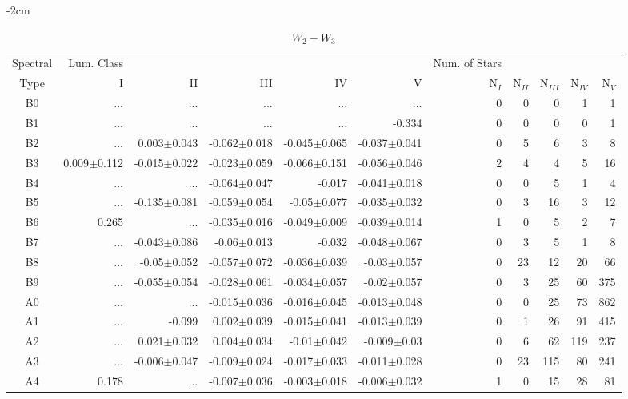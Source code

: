 \begin{table}[t]
\tiny
\centering
\caption{$W_{2}-W_{3}$}
\begin{center}
    \addtolength{\leftskip} {-2cm}
    \addtolength{\rightskip}{-2cm}
    \begin{tabular}{c|rrrrr|rrrrr}
    \toprule
    Spectral & Lum. Class & & & & & Num. of Stars & & & &  \\
    Type & I & II & III &  IV & V & N$_{I}$ & N$_{II}$ & N$_{III}$ & N$_{IV}$ & N$_{V}$ \\ \midrule
 
  
B0	&	 ...	&	 ...	&	 ...	&	 ...	&	 ...	&	0	&	0	&	0	&	1	&	1	\\
B1	&	 ...	&	 ...	&	 ...	&	 ...	&	-0.334	&	0	&	0	&	0	&	0	&	1	\\
B2	&	 ...	&	0.003$\pm$0.043	&	-0.062$\pm$0.018	&	-0.045$\pm$0.065	&	-0.037$\pm$0.041	&	0	&	5	&	6	&	3	&	8	\\
B3	&	0.009$\pm$0.112	&	-0.015$\pm$0.022	&	-0.023$\pm$0.059	&	-0.066$\pm$0.151	&	-0.056$\pm$0.046	&	2	&	4	&	4	&	5	&	16	\\
B4	&	 ...	&	 ...	&	-0.064$\pm$0.047	&	-0.017	&	-0.041$\pm$0.018	&	0	&	0	&	5	&	1	&	4	\\
B5	&	 ...	&	-0.135$\pm$0.081	&	-0.059$\pm$0.054	&	-0.05$\pm$0.077	&	-0.035$\pm$0.032	&	0	&	3	&	16	&	3	&	12	\\
B6	&	0.265	&	 ...	&	-0.035$\pm$0.016	&	-0.049$\pm$0.009	&	-0.039$\pm$0.014	&	1	&	0	&	5	&	2	&	7	\\
B7	&	 ...	&	-0.043$\pm$0.086	&	-0.06$\pm$0.013	&	-0.032	&	-0.048$\pm$0.067	&	0	&	3	&	5	&	1	&	8	\\
B8	&	 ...	&	-0.05$\pm$0.052	&	-0.057$\pm$0.072	&	-0.036$\pm$0.039	&	-0.03$\pm$0.057	&	0	&	23	&	12	&	20	&	66	\\
B9	&	 ...	&	-0.055$\pm$0.054	&	-0.028$\pm$0.061	&	-0.034$\pm$0.057	&	-0.02$\pm$0.057	&	0	&	3	&	25	&	60	&	375	\\
A0	&	 ...	&	 ...	&	-0.015$\pm$0.036	&	-0.016$\pm$0.045	&	-0.013$\pm$0.048	&	0	&	0	&	25	&	73	&	862	\\
A1	&	 ...	&	-0.099	&	0.002$\pm$0.039	&	-0.015$\pm$0.041	&	-0.013$\pm$0.039	&	0	&	1	&	26	&	91	&	415	\\
A2	&	 ...	&	0.021$\pm$0.032	&	0.004$\pm$0.034	&	-0.01$\pm$0.042	&	-0.009$\pm$0.03	&	0	&	6	&	62	&	119	&	237	\\
A3	&	 ...	&	-0.006$\pm$0.047	&	-0.009$\pm$0.024	&	-0.017$\pm$0.033	&	-0.011$\pm$0.028	&	0	&	23	&	115	&	80	&	241	\\
A4	&	0.178	&	 ...	&	-0.007$\pm$0.036	&	-0.003$\pm$0.018	&	-0.006$\pm$0.032	&	1	&	0	&	15	&	28	&	81	\\

\end{tabular}
\end{center}
\end{table}

